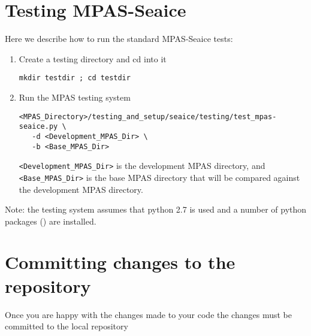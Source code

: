 \documentclass{article}
\begin{document}

\section{Testing MPAS-Seaice}
\label{sec:testing}

Here we describe how to run the standard MPAS-Seaice tests:

\begin{enumerate}

\item Create a testing directory and cd into it

\verb+mkdir testdir ; cd testdir+

\item Run the MPAS testing system

\begin{verbatim}
<MPAS_Directory>/testing_and_setup/seaice/testing/test_mpas-seaice.py \
   -d <Development_MPAS_Dir> \
   -b <Base_MPAS_Dir>
\end{verbatim}

\verb+<Development_MPAS_Dir>+ is the development MPAS directory, and \verb+<Base_MPAS_Dir>+ is the base MPAS directory that will be compared against the development MPAS directory.

\end{enumerate}

Note: the testing system assumes that python 2.7 is used and a number of python packages () are installed.


\section{Committing changes to the repository}
\label{sec:committing}

Once you are happy with the changes made to your code the changes must be committed to the local repository
\end{document}
